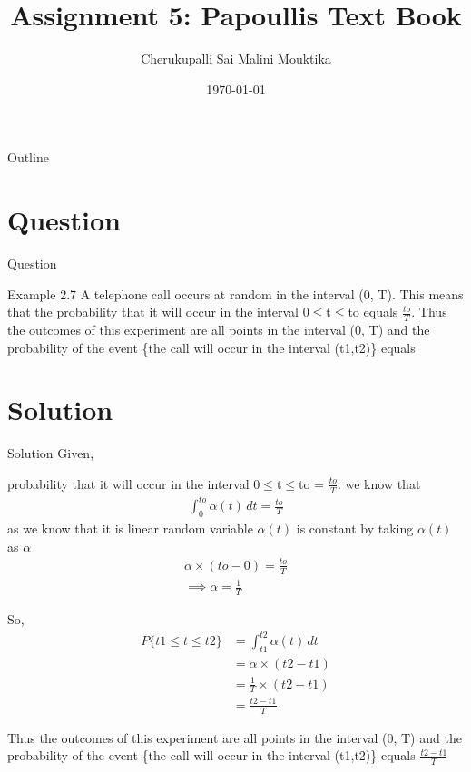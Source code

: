 \documentclass{beamer}
\title{Assignment 5: Papoullis Text Book}
\author{Cherukupalli Sai Malini Mouktika}
\date{\today}
\numberwithin{equation}{subsection}
\begin{document}
\begin{frame}
    \titlepage 
\end{frame}

\logo{}

\begin{frame}{Outline}
    \tableofcontents
\end{frame}
\section{Question}
\begin{frame}{Question}
    \begin{block}{Example 2.7}
    A telephone call occurs at random in the interval (0, T). This means that the probability that it will occur in the interval 0$\leq$t$\leq$to equals $\frac{to}{T}$. Thus the outcomes of this 
experiment are all points in the interval (0, T) and the probability of the event \{the call will occur in the interval (t1,t2)\} equals 


    \end{block}
\end{frame}
\section{Solution}
	\begin{frame}{Solution}
Given,

probability that it will occur in the interval 0$\leq$t$\leq$to = $\frac{to}{T}$. we know that 
\begin{align}
\int_{0}^{to} \alpha(t) \, dt = \frac{to}{T}
\end{align}
as we know that it is linear random variable $\alpha(t)$ is constant
by taking $\alpha(t)$ as $\alpha$ 
\begin{align}
\alpha\times(to-0)= \frac{to}{T}\\
\implies
\alpha = \frac{1}{T}
\end{align}
\end{frame}
\begin{frame}{}
 So,
\begin{align}
P\{t1 \leq t\leq t2\} &=  \int_{t1}^{t2} \alpha(t) \, dt\\
 &= \alpha\times(t2-t1)\\
 &= \frac{1}{T}\times(t2-t1)\\
 &=\frac{t2-t1}{T}
\end{align}
\end{frame}
\begin{frame}
  Thus the outcomes of this 
experiment are all points in the interval (0, T) and the probability of the event \{the call will occur in the interval (t1,t2)\} equals $\frac{t2-t1}{T}$  
\end{frame}
\end{document}
